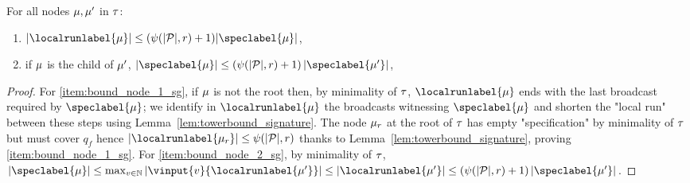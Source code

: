 \begin{lemma}
\label{lem:bounds_tree_sg}
For all nodes $\mu, \mu'$ in $\tau$: \begin{enumerate}
\item \label{item:bound_node_1_sg} $\size{\localrunlabel{\node}} \leq (\towerfun(\size{\prot}, r)+1) \size{\speclabel{\node}}$,
\item \label{item:bound_node_2_sg} if $\mu$ is the child of $\mu'$, $\size{\speclabel{\node}} \leq (\towerfun(\size{\prot}, r)+1) \, \size{\speclabel{\node'}}$,
\end{enumerate} 
\end{lemma}
\begin{proof}
For \ref{item:bound_node_1_sg}, if $\mu$ is not the root then, by minimality of $\tau$, $\localrunlabel{\node}$ ends with the last broadcast required by $\speclabel{\node}$; we identify in $\localrunlabel{\node}$ the broadcasts witnessing $\speclabel{\node}$ and shorten the "local run" between these steps using Lemma~\ref{lem:towerbound_signature}.  The node $\mu_r$ at the root of $\tau$ has empty "specification" by minimality of $\tau$ but must cover $q_f$ hence $\size{\localrunlabel{\node_r}} \leq \towerfun(\size{\prot},r)$ thanks to Lemma~\ref{lem:towerbound_signature}, proving \ref{item:bound_node_1_sg}.
For \ref{item:bound_node_2_sg}, by minimality of $\tau$, $\size{\speclabel{\node}} \leq \max_{v \in \nats} \size{\vinput{v}{\localrunlabel{\node'}}} \leq \size{\localrunlabel{\node'}} \leq (\towerfun(\size{\prot}, r)+1) \, \size{\speclabel{\node'}}$. 
\end{proof}


